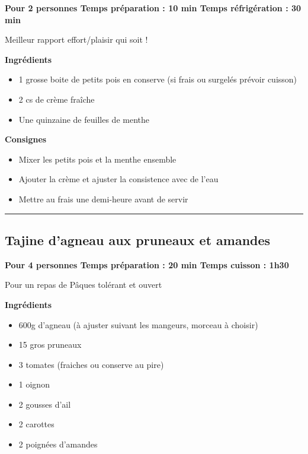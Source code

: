 \documentclass[]{book}
\providecommand{\tightlist}{%
  \setlength{\itemsep}{0pt}\setlength{\parskip}{0pt}}
\begin{document}
\begin{salebox}
\textbf{Pour 2 personnes \textbar{} Temps préparation : 10 min
\textbar{} Temps réfrigération : 30 min}

Meilleur rapport effort/plaisir qui soit !
\end{salebox}

\textbf{Ingrédients}

\begin{itemize}
\tightlist
\item
  1 grosse boite de petits pois en conserve (si frais ou surgelés prévoir cuisson)
\item
  2 cs de crème fraîche
\item
  Une quinzaine de feuilles de menthe
\end{itemize}

\textbf{Consignes}

\begin{itemize}
\tightlist
\item
  Mixer les petits pois et la menthe ensemble
\item
  Ajouter la crème et ajuster la consistence avec de l'eau
\item
  Mettre au frais une demi-heure avant de servir
\end{itemize}

\begin{center}\rule{0.5\linewidth}{0.5pt}\end{center}

\hypertarget{tajine-dagneau-aux-pruneaux-et-amandes}{%
\subsection*{\texorpdfstring{{Tajine d'agneau aux pruneaux et amandes}}{Tajine d'agneau aux pruneaux et amandes}}\label{tajine-dagneau-aux-pruneaux-et-amandes}}

\begin{salebox}
\textbf{Pour 4 personnes \textbar{} Temps préparation : 20 min
\textbar{} Temps cuisson : 1h30}

Pour un repas de Pâques tolérant et ouvert
\end{salebox}

\textbf{Ingrédients}

\begin{itemize}
\tightlist
\item
  600g d'agneau (à ajuster suivant les mangeurs, morceau à choisir)
\item
  15 gros pruneaux
\item
  3 tomates (fraiches ou conserve au pire)
\item
  1 oignon
\item
  2 gousses d'ail
\item
  2 carottes
\item
  2 poignées d'amandes
\end{itemize}
\end{document}
